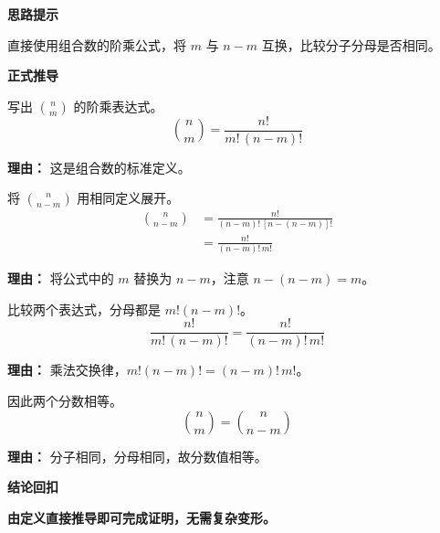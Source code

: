 \begin{proofbox}
	\textbf{\textcolor{CProof}{思路提示}}

	直接使用组合数的阶乘公式，将 $m$ 与 $n-m$ 互换，比较分子分母是否相同。

	\medskip
	\textbf{\textcolor{CProof}{正式推导}}
	\begin{description}[style=nextline, leftmargin=2.8em, labelsep=0.5em, itemsep=0.55em]
		\item[\textbf{步骤一（定义展开）：}] 写出 $\binom{n}{m}$ 的阶乘表达式。
			\[
				\binom{n}{m} = \frac{n!}{m!\,(n-m)!}
			\]
			\par\textbf{理由：}
			这是组合数的标准定义。

		\item[\textbf{步骤二（替换参数）：}] 将 $\binom{n}{n-m}$ 用相同定义展开。
			\[
				\begin{aligned}
					\binom{n}{n-m}
					&= \frac{n!}{(n-m)!\,[n-(n-m)]!} \\
					&= \frac{n!}{(n-m)!\,m!}
			\end{aligned}
			\]
			\par\textbf{理由：}
			将公式中的 $m$ 替换为 $n-m$，注意 $n-(n-m)=m$。

		\item[\textbf{步骤三（交换顺序）：}] 比较两个表达式，分母都是 $m!(n-m)!$。
			\[
				\frac{n!}{m!\,(n-m)!} = \frac{n!}{(n-m)!\,m!}
			\]
			\par\textbf{理由：}
			乘法交换律，$m!(n-m)! = (n-m)!\,m!$。

		\item[\textbf{步骤四（得出相等）：}] 因此两个分数相等。
			\[
				\binom{n}{m} = \binom{n}{n-m}
			\]
			\par\textbf{理由：}
			分子相同，分母相同，故分数值相等。
	\end{description}

	\medskip
	\textbf{\textcolor{CProof}{结论回扣}}

	\textbf{由定义直接推导即可完成证明，无需复杂变形。}
\end{proofbox}
